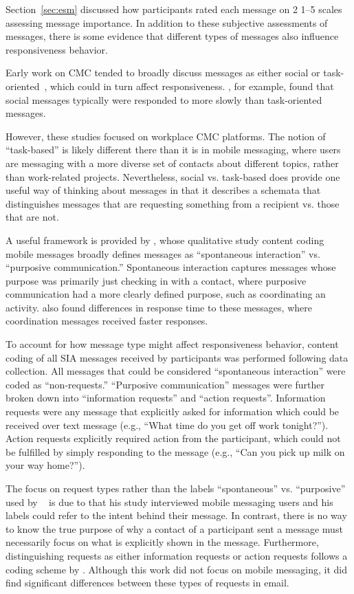 \documentclass[12pt]{nuthesis}	%
\begin{document}
Section~\ref{sec:esm} discussed how participants rated each message on 2 1--5 scales assessing message importance. In addition to these subjective assessments of messages, there is some evidence that different types of messages also influence responsiveness behavior.

Early work on CMC tended to broadly discuss messages as either social or task-oriented~\citep[e.g.,][]{addas2015many,dabbish2005understanding,walther1992interpersonal}, which could in turn affect responsiveness. \citet{dabbish2005understanding}, for example, found that social messages typically were responded to more slowly than task-oriented messages.

However, these studies focused on workplace CMC platforms. The notion of ``task-based'' is likely different there than it is in mobile messaging, where users are messaging with a more diverse set of contacts about different topics, rather than work-related projects. Nevertheless, social vs. task-based does provide one useful way of thinking about messages in that it describes a schemata that distinguishes messages that are requesting something from a recipient vs. those that are not.

A useful framework is provided by \citet{cui2016beyond}, whose qualitative study content coding mobile messages broadly defines messages as ``spontaneous interaction'' vs. ``purposive communication.'' Spontaneous interaction captures messages whose purpose was primarily just checking in with a contact, where purposive communication had a more clearly defined purpose, such as coordinating an activity. \citet{cui2016beyond} also found differences in response time to these messages, where coordination messages received faster responses.

To account for how message type might affect responsiveness behavior, content coding of all SIA messages received by participants was performed following data collection. All messages that could be considered ``spontaneous interaction'' were coded as ``non-requests.'' ``Purposive communication'' messages were further broken down into ``information requests'' and ``action requests''. Information requests were any message that explicitly asked for information which could be received over text message (e.g., ``What time do you get off work tonight?''). Action requests explicitly required action from the participant, which could not be fulfilled by simply responding to the message (e.g., ``Can you pick up milk on your way home?'').

The focus on request types rather than the labels ``spontaneous'' vs. ``purposive'' used by ~\citeauthor{cui2016beyond} is due to that his study interviewed mobile messaging users and his labels could refer to the intent behind their message. In contrast, there is no way to know the true purpose of why a contact of a participant sent a message must necessarily focus on what is explicitly shown in the message. Furthermore, distinguishing requests as either information requests or action requests follows a coding scheme by \citet{dabbish2005understanding}. Although this work did not focus on mobile messaging, it did find significant differences between these types of requests in email.
\end{document}
